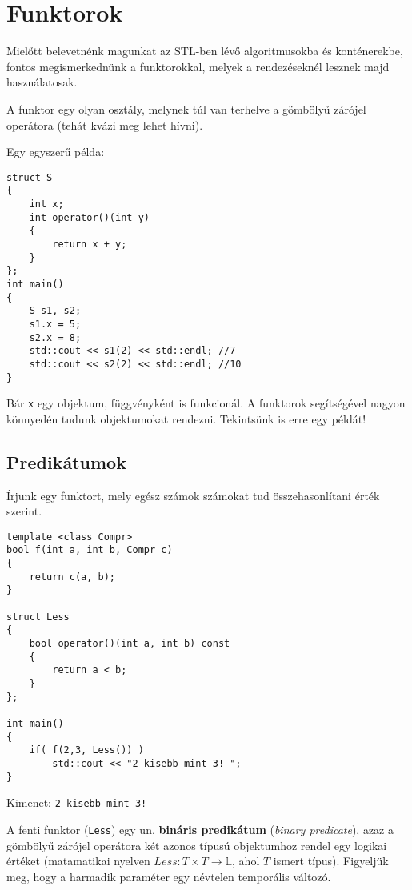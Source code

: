 \documentclass[../cpp_book/cpp_book.tex]{subfiles}
\begin{document}
	\section{Funktorok}
	Mielőtt belevetnénk magunkat az STL-ben lévő algoritmusokba és konténerekbe, fontos megismerkednünk a funktorokkal, melyek a rendezéseknél lesznek majd használatosak.
	\medskip
	
	A funktor egy olyan osztály, melynek túl van terhelve a gömbölyű zárójel operátora (tehát kvázi meg lehet hívni).
	
	\smallskip
	Egy egyszerű példa:
	\begin{lstlisting}
struct S
{
	int x;
	int operator()(int y)
	{
		return x + y;
	}
};
int main()
{
	S s1, s2;
	s1.x = 5;
	s2.x = 8;
	std::cout << s1(2) << std::endl; //7
	std::cout << s2(2) << std::endl; //10
}
	\end{lstlisting}
	Bár \texttt{x} egy objektum, függvényként is funkcionál. A funktorok segítségével nagyon könnyedén tudunk objektumokat rendezni. Tekintsünk is erre egy példát!
	\subsection{Predikátumok}
	Írjunk egy funktort, mely egész számok számokat tud összehasonlítani érték szerint.
	\begin{lstlisting}
template <class Compr>
bool f(int a, int b, Compr c)
{
	return c(a, b);
}

struct Less
{
	bool operator()(int a, int b) const
	{
		return a < b;
	}
};

int main()
{
	if( f(2,3, Less()) )
		std::cout << "2 kisebb mint 3! ";
}
	\end{lstlisting}
	Kimenet: \texttt{2 kisebb mint 3!}
	
	A fenti funktor (\texttt{Less}) egy un. \textbf{bináris predikátum} (\textit{binary predicate}), azaz a gömbölyű zárójel operátora két azonos típusú objektumhoz rendel egy logikai értéket (matamatikai nyelven $Less: T\times T \to \mathbb{L}$, ahol $T$ ismert típus). Figyeljük meg, hogy a harmadik paraméter egy névtelen temporális változó. 
	
\end{document}
